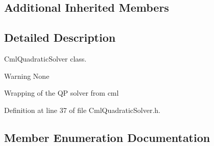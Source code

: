 \subsection*{Additional Inherited Members}


\subsection{Detailed Description}
Cml\+Quadratic\+Solver class. 

\begin{DoxyWarning}{Warning}
None
\end{DoxyWarning}
Wrapping of the QP solver from cml 

Definition at line 37 of file Cml\+Quadratic\+Solver.\+h.



\subsection{Member Enumeration Documentation}
